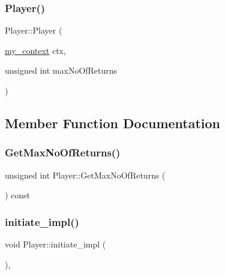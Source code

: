 \subsubsection{\texorpdfstring{Player()}{Player()}}
{\footnotesize\ttfamily Player\+::\+Player (\begin{DoxyParamCaption}\item[{\mbox{\hyperlink{classboost_1_1statechart_1_1event__processor_a99f1c6ec8419ec82f140c5c93c5eb8cd}{my\+\_\+context}}}]{ctx,  }\item[{unsigned int}]{max\+No\+Of\+Returns }\end{DoxyParamCaption})\hspace{0.3cm}{\ttfamily [inline]}}



\subsection{Member Function Documentation}
\mbox{\label{struct_player_a9baaf8634e23c87bcd785a79793dbd37}} 
\subsubsection{\texorpdfstring{Get\+Max\+No\+Of\+Returns()}{GetMaxNoOfReturns()}}
{\footnotesize\ttfamily unsigned int Player\+::\+Get\+Max\+No\+Of\+Returns (\begin{DoxyParamCaption}{ }\end{DoxyParamCaption}) const\hspace{0.3cm}{\ttfamily [inline]}}

\mbox{\label{struct_player_ae5001b1a7c1ba022d7bdb6d7da25e647}} 
\subsubsection{\texorpdfstring{initiate\+\_\+impl()}{initiate\_impl()}}
{\footnotesize\ttfamily void Player\+::initiate\+\_\+impl (\begin{DoxyParamCaption}{ }\end{DoxyParamCaption})\hspace{0.3cm}{\ttfamily [private]}, {\ttfamily [virtual]}}



